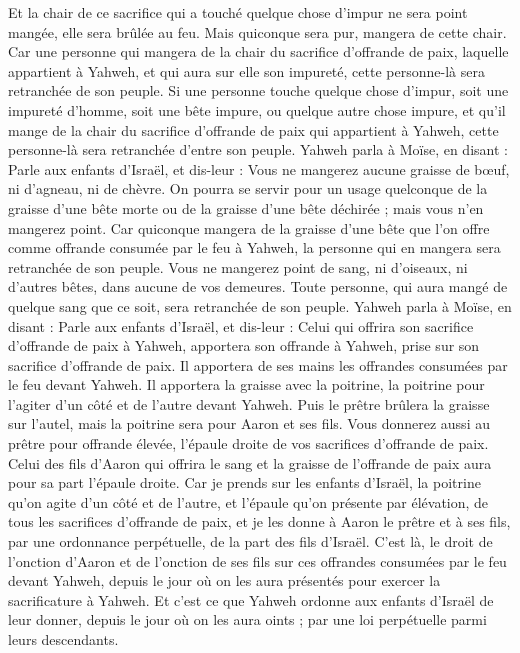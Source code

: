\begin{multicols}{2}
Et la chair de ce sacrifice qui a touché quelque chose d'impur ne sera point mangée, elle sera brûlée au feu. Mais quiconque sera pur, mangera de cette chair.
Car une personne qui mangera de la chair du sacrifice d'offrande de paix, laquelle appartient à Yahweh, et qui aura sur elle son impureté, cette personne-là sera retranchée de son peuple.
Si une personne touche quelque chose d'impur, soit une impureté d'homme, soit une bête impure, ou quelque autre chose impure, et qu'il mange de la chair du sacrifice d'offrande de paix qui appartient à Yahweh, cette personne-là sera retranchée d'entre son peuple.
Yahweh parla à Moïse, en disant :
Parle aux enfants d'Israël, et dis-leur : Vous ne mangerez aucune graisse de bœuf, ni d'agneau, ni de chèvre.
On pourra se servir pour un usage quelconque de la graisse d'une bête morte ou de la graisse d'une bête déchirée ; mais vous n'en mangerez point.
Car quiconque mangera de la graisse d'une bête que l'on offre comme offrande consumée par le feu à Yahweh, la personne qui en mangera sera retranchée de son peuple.
Vous ne mangerez point de sang, ni d'oiseaux, ni d'autres bêtes, dans aucune de vos demeures.
Toute personne, qui aura mangé de quelque sang que ce soit, sera retranchée de son peuple.
Yahweh parla à Moïse, en disant :
Parle aux enfants d'Israël, et dis-leur : Celui qui offrira son sacrifice d'offrande de paix à Yahweh, apportera son offrande à Yahweh, prise sur son sacrifice d'offrande de paix.
Il apportera de ses mains les offrandes consumées par le feu devant Yahweh. Il apportera la graisse avec la poitrine, la poitrine pour l'agiter d'un côté et de l'autre devant Yahweh.
Puis le prêtre brûlera la graisse sur l'autel, mais la poitrine sera pour Aaron et ses fils.
Vous donnerez aussi au prêtre pour offrande élevée, l'épaule droite de vos sacrifices d'offrande de paix.
Celui des fils d'Aaron qui offrira le sang et la graisse de l'offrande de paix aura pour sa part l'épaule droite.
Car je prends sur les enfants d'Israël, la poitrine qu'on agite d'un côté et de l'autre, et l'épaule qu'on présente par élévation, de tous les sacrifices d'offrande de paix, et je les donne à Aaron le prêtre et à ses fils, par une ordonnance perpétuelle, de la part des fils d'Israël.
C'est là, le droit de l'onction d'Aaron et de l'onction de ses fils sur ces offrandes consumées par le feu devant Yahweh, depuis le jour où on les aura présentés pour exercer la sacrificature à Yahweh.
Et c'est ce que Yahweh ordonne aux enfants d'Israël de leur donner, depuis le jour où on les aura oints ; par une loi perpétuelle parmi leurs descendants.

\end{multicols}

